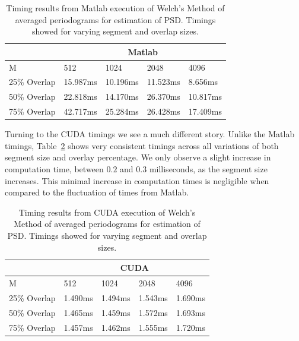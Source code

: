 \begin{table}
\begin{center}
\begin{tabular}{|l|l|l|l|l|}
\hline
 & \multicolumn{4}{|c|}{Matlab} \\
\hline
M & 512 & 1024 & 2048 & 4096 \\
\hline
25\% Overlap & 15.987ms & 10.196ms & 11.523ms & 8.656ms \\
50\% Overlap & 22.818ms & 14.170ms & 26.370ms & 10.817ms \\
75\% Overlap & 42.717ms & 25.284ms & 26.428ms & 17.409ms \\
\hline
\end{tabular}
\vspace{0.5cm}
\caption{Timing results from Matlab execution of Welch's Method of averaged periodograms for estimation of PSD.  Timings showed for varying segment and overlap sizes.}
\label{tbl:pwelch_matlab_timings}
\end{center}
\end{table}

Turning to the CUDA timings we see a much different story.  Unlike the Matlab timings, Table~\ref{tbl:pwelch_cuda_timings} shows very consistent timings across all variations of both segment size and overlay percentage.  We only observe a slight increase in computation time, between $0.2$ and $0.3$ milliseconds, as the segment size increases.  This minimal increase in computation times is negligible when compared to the fluctuation of times from Matlab.

\begin{table}
\begin{center}
\begin{tabular}{|l|l|l|l|l|}
\hline
 & \multicolumn{4}{|c|}{CUDA} \\
\hline
M & 512 & 1024 & 2048 & 4096 \\
\hline
25\% Overlap & 1.490ms & 1.494ms & 1.543ms & 1.690ms \\
50\% Overlap & 1.465ms & 1.459ms & 1.572ms & 1.693ms \\
75\% Overlap & 1.457ms & 1.462ms & 1.555ms & 1.720ms \\
\hline
\end{tabular}
\vspace{0.5cm}
\caption{Timing results from CUDA execution of Welch's Method of averaged periodograms for estimation of PSD.  Timings showed for varying segment and overlap sizes.}
\label{tbl:pwelch_cuda_timings}
\end{center}
\end{table}

